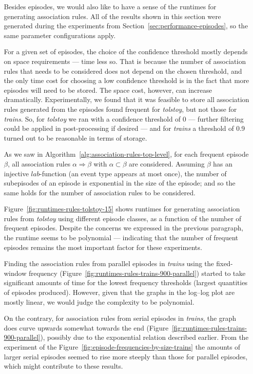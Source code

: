 Besides episodes, we would also like to have a sense of the runtimes for generating association rules. All of the results shown in this section were generated during the experiments from Section~\ref{sec:performance-episodes}, so the same parameter configurations apply.

For a given set of episodes, the choice of the confidence threshold mostly depends on space requirements --- time less so. That is because the number of association rules that needs to be considered does not depend on the chosen threshold, and the only time cost for choosing a low confidence threshold is in the fact that more episodes will need to be stored. The space cost, however, can increase dramatically. Experimentally, we found that it was feasible to store all association rules generated from the episodes found frequent for \emph{tolstoy}, but not those for \emph{trains}. So, for \emph{tolstoy} we ran with a confidence threshold of 0 --- further filtering could be applied in post-processing if desired --- and for \emph{trains} a threshold of 0.9 turned out to be reasonable in terms of storage.

As we saw in Algorithm~\ref{alg:association-rules-top-level}, for each frequent episode $ \beta $, all association rules $ \alpha \Rightarrow \beta $ with $ \alpha \subset \beta $ are considered. Assuming $ \beta $ has an injective $ lab $-function (an event type appears at most once), the number of subepisodes of an episode is exponential in the size of the episode; and so the same holds for the number of association rules to be considered.

Figure~\ref{fig:runtimes-rules-tolstoy-15} shows runtimes for generating association rules from \emph{tolstoy} using different episode classes, as a function of the number of frequent episodes. Despite the concerns we expressed in the previous paragraph, the runtime seems to be polynomial --- indicating that the number of frequent episodes remains the most important factor for these experiments.

Finding the association rules from parallel episodes in \emph{trains} using the fixed-window frequency (Figure~\ref{fig:runtimes-rules-trains-900-parallel}) started to take significant amounts of time for the lowest frequency thresholds (largest quantities of episodes produced). However, given that the graphs in the log--log plot are mostly linear, we would judge the complexity to be polynomial.

On the contrary, for association rules from serial episodes in \emph{trains}, the graph does curve upwards somewhat towards the end (Figure~\ref{fig:runtimes-rules-trains-900-parallel}), possibly due to the exponential relation described earlier. From the experiment of the Figure~\ref{fig:episode-frequencies-by-size-trains} the amounts of larger serial episodes seemed to rise more steeply than those for parallel episodes, which might contribute to these results.

